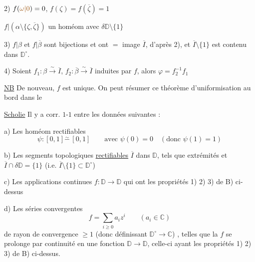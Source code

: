 
2) $f(\unsure{\omega|0})=0$, $f(\zeta)=f(\overline\zeta)=1$

$f|(\alpha\setminus\{\zeta,\overline\zeta\})$  un
homéom avec $\delta\mathbb D\setminus\{1\}$

3)  $f|\beta$ et $f|\overline\beta$ sont bijections et
ont $=$ image $\overline I$,  d'après
2), et $\overline I\setminus\{1\}$ est contenu dans $\mathbb D^\circ$.

4) Soient $f_1:\beta\overset\sim\longrightarrow\overline I$, $f_2:\overline\beta\overset\sim\longrightarrow\overline I$ induites par $f$,
alors $\varphi=f_2^{-1}f_1$

\uline{NB} De nouveau, $f$ est unique. On peut
résumer ce théorème d'uniformisation
au bord dans le 

\uline{Scholie} Il y a corr. $1$-$1$ entre les
données suivantes :

a) Les homéom rectifiables 
\[
\psi:[0,1]\overset\sim-\,[0,1]
\qquad\text{avec }\psi(0)=0\quad(\text{donc }\psi(1)=1)
\]

b) Les segments topologiques \uline{rectifiables}
$\overline I$ dans $\mathbb D$, tels que
extrémités et 
$\overline I\cap\delta\mathbb D=\{1\}$ (i.e.
$\overline I\setminus\{1\}\subset\mathbb D^\circ$)

c) Les  applications continues $f:\mathbb D\longrightarrow\mathbb D$
qui ont les propriétés 1) 2) 3) de B) ci-dessus

d) Les séries convergentes
\[
f=\sum_{i\geq0}a_i z^i\qquad(a_i\in\mathbb C)
\]
de rayon de convergence $\geq1$ (donc
définissant $\mathbb D^\circ\longrightarrow\mathbb C$)
, telles que la $f$
se prolonge par continuité en une
fonction $\mathbb D\longrightarrow\mathbb D$, celle-ci ayant les
propriétés 1) 2) 3) de B) ci-dessus.

